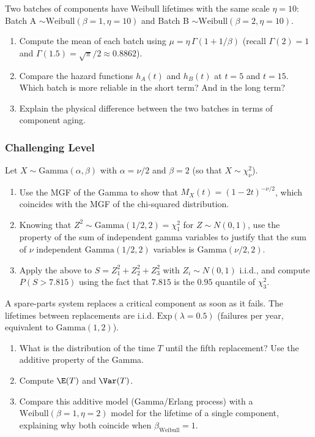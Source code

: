 \begin{problema}
	\label{prob:4.7.8}
	Two batches of components have Weibull lifetimes with the same scale $\eta = 10$: Batch A $\sim \text{Weibull}(\beta=1, \eta=10)$ and Batch B $\sim \text{Weibull}(\beta=2, \eta=10)$.
	\begin{enumerate}
		\item Compute the mean of each batch using $\mu = \eta\,\Gamma(1+1/\beta)$ (recall $\Gamma(2)=1$ and $\Gamma(1.5) = \sqrt{\pi}/2 \approx 0.8862$).
		\item Compare the hazard functions $h_{A}(t)$ and $h_{B}(t)$ at $t=5$ and $t=15$. Which batch is more reliable in the short term? And in the long term?
		\item Explain the physical difference between the two batches in terms of component aging.
	\end{enumerate}
\end{problema}

\subsubsection*{Challenging Level}

\begin{problema}
	\label{prob:4.7.9}
	Let $X \sim \text{Gamma}(\alpha,\beta)$ with $\alpha = \nu/2$ and $\beta = 2$ (so that $X \sim \chi^{2}_{\nu}$).
	\begin{enumerate}
		\item Use the MGF of the Gamma to show that $M_{X}(t) = (1-2t)^{-\nu/2}$, which coincides with the MGF of the chi-squared distribution.
		\item Knowing that $Z^{2} \sim \text{Gamma}(1/2, 2) = \chi^{2}_{1}$ for $Z \sim N(0,1)$, use the property of the sum of independent gamma variables to justify that the sum of $\nu$ independent $\text{Gamma}(1/2,2)$ variables is $\text{Gamma}(\nu/2, 2)$.
		\item Apply the above to $S = Z_{1}^{2}+Z_{2}^{2}+Z_{3}^{2}$ with $Z_{i} \sim N(0,1)$ i.i.d., and compute $P(S > 7.815)$ using the fact that $7.815$ is the $0.95$ quantile of $\chi^{2}_{3}$.
	\end{enumerate}
\end{problema}

\begin{problema}
	\label{prob:4.7.10}
	A spare-parts system replaces a critical component as soon as it fails. The lifetimes between replacements are i.i.d. $\text{Exp}(\lambda=0.5)$ (failures per year, equivalent to $\text{Gamma}(1,2)$).
	\begin{enumerate}
		\item What is the distribution of the time $T$ until the fifth replacement? Use the additive property of the Gamma.
		\item Compute $\E(T)$ and $\Var(T)$.
		\item Compare this additive model (Gamma/Erlang process) with a $\text{Weibull}(\beta=1,\eta=2)$ model for the lifetime of a single component, explaining why both coincide when $\beta_{\text{Weibull}}=1$.
	\end{enumerate}
\end{problema}

